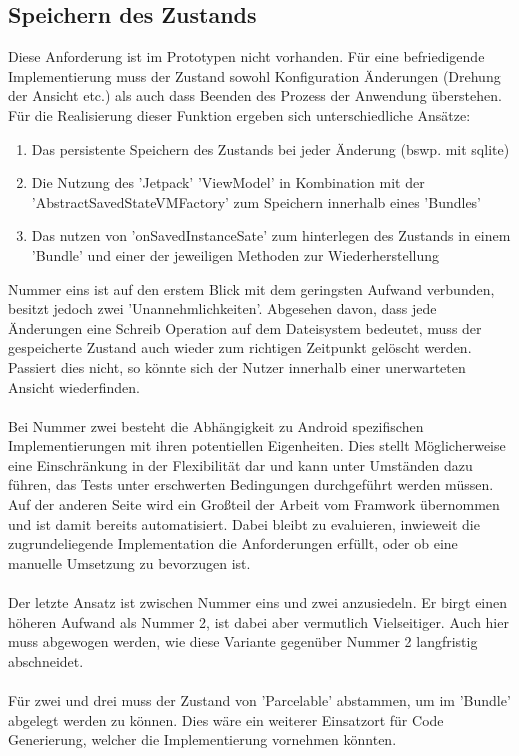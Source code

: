 \subsection{Speichern des Zustands}
\label{subsec:speicher-des-zustands}
Diese Anforderung ist im Prototypen nicht vorhanden. Für eine befriedigende Implementierung muss der Zustand sowohl Konfiguration Änderungen (Drehung der Ansicht etc.) als auch dass Beenden des Prozess der Anwendung überstehen. Für die Realisierung dieser Funktion ergeben sich unterschiedliche Ansätze:
\begin{enumerate}
	\item Das persistente Speichern des Zustands bei jeder Änderung (bswp. mit sqlite)
	\item Die Nutzung des 'Jetpack' 'ViewModel' in Kombination mit der 'AbstractSavedStateVMFactory'
	zum Speichern innerhalb eines 'Bundles'
	\item Das nutzen von 'onSavedInstanceSate' zum hinterlegen des Zustands in einem 'Bundle'  und einer der jeweiligen Methoden zur Wiederherstellung
\end{enumerate}
Nummer eins ist auf den erstem Blick mit dem geringsten Aufwand verbunden, besitzt jedoch zwei 'Unannehmlichkeiten'. Abgesehen davon, dass jede Änderungen eine Schreib Operation auf dem Dateisystem bedeutet, muss der gespeicherte Zustand auch wieder zum richtigen Zeitpunkt gelöscht werden. Passiert dies nicht, so könnte sich der Nutzer innerhalb einer unerwarteten Ansicht wiederfinden.
\\\\
Bei Nummer zwei besteht die Abhängigkeit zu Android spezifischen Implementierungen mit ihren potentiellen Eigenheiten. Dies stellt Möglicherweise eine Einschränkung in der Flexibilität dar und kann unter Umständen dazu führen, das Tests unter erschwerten Bedingungen durchgeführt werden müssen. Auf der anderen Seite wird ein Großteil der Arbeit vom Framwork übernommen und ist damit bereits automatisiert. Dabei bleibt zu evaluieren, inwieweit die zugrundeliegende Implementation die Anforderungen erfüllt, oder ob eine manuelle Umsetzung zu bevorzugen ist.
\\\\
Der letzte Ansatz ist zwischen Nummer eins und zwei anzusiedeln. Er birgt einen höheren Aufwand als Nummer 2, ist dabei aber vermutlich Vielseitiger. Auch hier muss abgewogen werden, wie diese Variante gegenüber Nummer 2 langfristig abschneidet.
\\\\
Für zwei und drei muss der Zustand von 'Parcelable' abstammen, um im 'Bundle' abgelegt werden zu können. Dies wäre ein weiterer Einsatzort für Code Generierung, welcher die Implementierung vornehmen könnten. 

